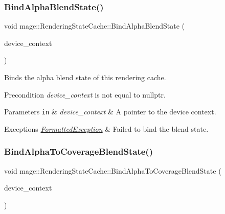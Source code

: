\subsubsection{\texorpdfstring{Bind\+Alpha\+Blend\+State()}{BindAlphaBlendState()}}
{\footnotesize\ttfamily void mage\+::\+Rendering\+State\+Cache\+::\+Bind\+Alpha\+Blend\+State (\begin{DoxyParamCaption}\item[{I\+D3\+D11\+Device\+Context2 $\ast$}]{device\+\_\+context }\end{DoxyParamCaption})}

Binds the alpha blend state of this rendering cache.

\begin{DoxyPrecond}{Precondition}
{\itshape device\+\_\+context} is not equal to {\ttfamily nullptr}. 
\end{DoxyPrecond}

\begin{DoxyParams}[1]{Parameters}
\mbox{\tt in}  & {\em device\+\_\+context} & A pointer to the device context. \\
\hline
\end{DoxyParams}

\begin{DoxyExceptions}{Exceptions}
{\em \hyperlink{structmage_1_1_formatted_exception}{Formatted\+Exception}} & Failed to bind the blend state. \\
\hline
\end{DoxyExceptions}
\hypertarget{structmage_1_1_rendering_state_cache_ac4e48cadea14a33c545ef6cd95971114}{}\label{structmage_1_1_rendering_state_cache_ac4e48cadea14a33c545ef6cd95971114} 
\subsubsection{\texorpdfstring{Bind\+Alpha\+To\+Coverage\+Blend\+State()}{BindAlphaToCoverageBlendState()}}
{\footnotesize\ttfamily void mage\+::\+Rendering\+State\+Cache\+::\+Bind\+Alpha\+To\+Coverage\+Blend\+State (\begin{DoxyParamCaption}\item[{I\+D3\+D11\+Device\+Context2 $\ast$}]{device\+\_\+context }\end{DoxyParamCaption})}

